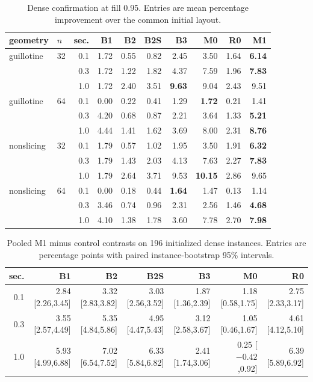 \documentclass[11pt]{article}
\begin{document}
\begin{table}[htbp]
\centering
\caption{Dense confirmation at fill 0.95. Entries are mean percentage
improvement over the common initial layout.}
\label{tab:sharedfull}
\small
\setlength{\tabcolsep}{4pt}
\begin{tabular}{@{}llrrrrrrrr@{}}
\toprule
geometry & $n$ & sec. & B1 & B2 & B2S & B3 & M0 & R0 & M1 \\
\midrule
guillotine & 32 & 0.1 & 1.72 & 0.55 & 0.82 & 2.45 & 3.50 & 1.64 & \textbf{6.14} \\
            &    & 0.3 & 1.72 & 1.22 & 1.82 & 4.37 & 7.59 & 1.96 & \textbf{7.83} \\
            &    & 1.0 & 1.72 & 2.40 & 3.51 & \textbf{9.63} & 9.04 & 2.43 & 9.51 \\
guillotine & 64 & 0.1 & 0.00 & 0.22 & 0.41 & 1.29 & \textbf{1.72} & 0.21 & 1.41 \\
            &    & 0.3 & 4.20 & 0.68 & 0.87 & 2.21 & 3.64 & 1.33 & \textbf{5.21} \\
            &    & 1.0 & 4.44 & 1.41 & 1.62 & 3.69 & 8.00 & 2.31 & \textbf{8.76} \\
nonslicing & 32 & 0.1 & 1.79 & 0.57 & 1.02 & 1.95 & 3.50 & 1.91 & \textbf{6.32} \\
            &    & 0.3 & 1.79 & 1.43 & 2.03 & 4.13 & 7.63 & 2.27 & \textbf{7.83} \\
            &    & 1.0 & 1.79 & 2.64 & 3.71 & 9.53 & \textbf{10.15} & 2.86 & 9.65 \\
nonslicing & 64 & 0.1 & 0.00 & 0.18 & 0.44 & \textbf{1.64} & 1.47 & 0.13 & 1.14 \\
            &    & 0.3 & 3.46 & 0.74 & 0.96 & 2.31 & 2.56 & 1.46 & \textbf{4.68} \\
            &    & 1.0 & 4.10 & 1.38 & 1.78 & 3.60 & 7.78 & 2.70 & \textbf{7.98} \\
\bottomrule
\end{tabular}
\end{table}

\begin{table}[htbp]
\centering
\caption{Pooled M1 minus control contrasts on 196 initialized dense instances.
Entries are percentage points with paired instance-bootstrap 95\% intervals.}
\label{tab:sharedcontrasts}
\scriptsize
\setlength{\tabcolsep}{2.4pt}
\begin{tabular}{@{}rrrrrrr@{}}
\toprule
sec. & B1 & B2 & B2S & B3 & M0 & R0 \\
\midrule
0.1 & 2.84 [2.26,3.45] & 3.32 [2.83,3.82] & 3.03 [2.56,3.52] & 1.87 [1.36,2.39] & 1.18 [0.58,1.75] & 2.75 [2.33,3.17] \\
0.3 & 3.55 [2.57,4.49] & 5.35 [4.84,5.86] & 4.95 [4.47,5.43] & 3.12 [2.58,3.67] & 1.05 [0.46,1.67] & 4.61 [4.12,5.10] \\
1.0 & 5.93 [4.99,6.88] & 7.02 [6.54,7.52] & 6.33 [5.84,6.82] & 2.41 [1.74,3.06] & 0.25 [$-0.42$,0.92] & 6.39 [5.89,6.92] \\
\bottomrule
\end{tabular}
\end{table}
\end{document}
